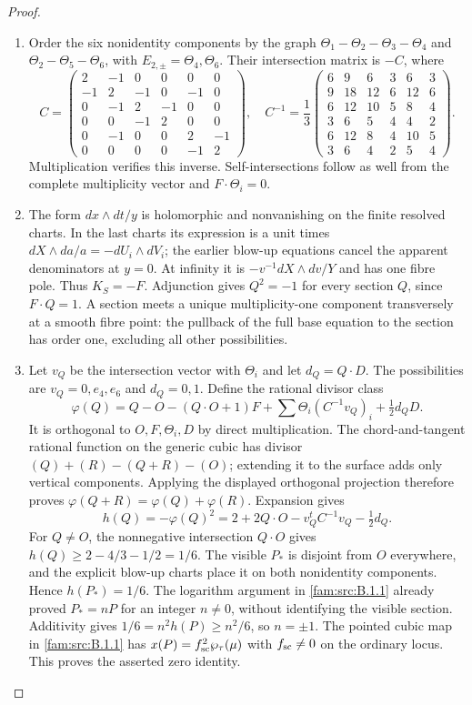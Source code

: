 \begin{proof}
\begin{enumerate}[label=\arabic*.,leftmargin=*]
\item Order the six nonidentity components by the graph
$\Theta_1-\Theta_2-\Theta_3-\Theta_4$ and $\Theta_2-\Theta_5-\Theta_6$, with $E_{2,\pm}=\Theta_4,\Theta_6$. Their intersection matrix is $-C$, where
\[
 C=\begin{pmatrix}2&-1&0&0&0&0\\-1&2&-1&0&-1&0\\0&-1&2&-1&0&0\\0&0&-1&2&0&0\\0&-1&0&0&2&-1\\0&0&0&0&-1&2\end{pmatrix},\quad
 C^{-1}=\frac13\begin{pmatrix}6&9&6&3&6&3\\9&18&12&6&12&6\\6&12&10&5&8&4\\3&6&5&4&4&2\\6&12&8&4&10&5\\3&6&4&2&5&4\end{pmatrix}.
\]
Multiplication verifies this inverse. Self-intersections follow as well from the complete multiplicity vector and $F\cdot\Theta_i=0$.

\item The form $dx\wedge dt/y$ is holomorphic and nonvanishing on the finite resolved charts. In the last charts its expression is a unit times $dX\wedge da/a=-dU_i\wedge dV_i$; the earlier blow-up equations cancel the apparent denominators at $y=0$. At infinity it is $-v^{-1}dX\wedge dv/Y$ and has one fibre pole. Thus $K_S=-F$. Adjunction gives $Q^2=-1$ for every section $Q$, since $F\cdot Q=1$. A section meets a unique multiplicity-one component transversely at a smooth fibre point: the pullback of the full base equation to the section has order one, excluding all other possibilities.

\item Let $v_Q$ be the intersection vector with $\Theta_i$ and let $d_Q=Q\cdot D$. The possibilities are $v_Q=0,e_4,e_6$ and $d_Q=0,1$. Define the rational divisor class
\[
 \varphi(Q)=Q-O-(Q\cdot O+1)F+\sum\Theta_i(C^{-1}v_Q)_i+\tfrac12d_QD.
\]
It is orthogonal to $O,F,\Theta_i,D$ by direct multiplication. The chord-and-tangent rational function on the generic cubic has divisor $(Q)+(R)-(Q+R)-(O)$; extending it to the surface adds only vertical components. Applying the displayed orthogonal projection therefore proves $\varphi(Q+R)=\varphi(Q)+\varphi(R)$. Expansion gives
\[
 h(Q)=-\varphi(Q)^2=2+2Q\cdot O-v_Q^tC^{-1}v_Q-\tfrac12d_Q.
\]
For $Q\ne O$, the nonnegative intersection $Q\cdot O$ gives $h(Q)\ge2-4/3-1/2=1/6$. The visible $P_*$ is disjoint from $O$ everywhere, and the explicit blow-up charts place it on both nonidentity components. Hence $h(P_*)=1/6$. The logarithm argument in \ref{fam:src:B.1.1} already proved $P_*=nP$ for an integer $n\ne0$, without identifying the visible section. Additivity gives $1/6=n^2h(P)\ge n^2/6$, so $n=\pm1$. The pointed cubic map in \ref{fam:src:B.1.1} has $x(P)=f_{\rm sc}^2\wp_\tau(\mu)$ with $f_{\rm sc}\ne0$ on the ordinary locus. This proves the asserted zero identity.
\end{enumerate}
\end{proof}

